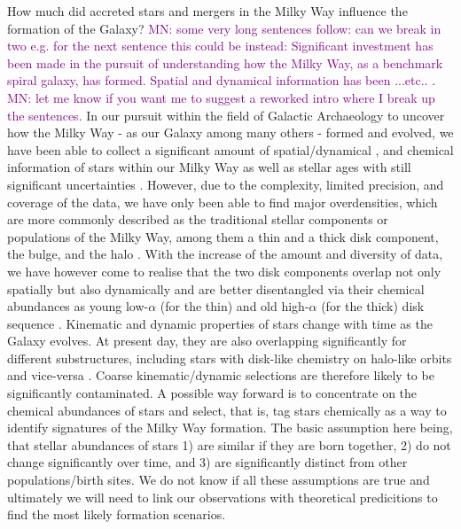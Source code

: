 \documentclass[fleqn,usenatbib]{mnras}
\newcommand{\mkn}[1]{{\textcolor{purple}{MN: #1}}}
\begin{document}
How much did accreted stars and mergers in the Milky Way influence the formation of the Galaxy? \mkn{some very long sentences follow: can we break in two e.g. for the next sentence this could be instead: Significant investment has been made in the pursuit of understanding how the Milky Way, as a benchmark spiral galaxy, has formed. Spatial and dynamical information has been ...etc.. }. \mkn{let me know if you want me to suggest a reworked intro where I break up the sentences.} In our pursuit within the field of Galactic Archaeology to uncover how the Milky Way - as our Galaxy among many others - formed and evolved, we have been able to collect a significant amount of spatial/dynamical \citep[e.g.][]{Brown2021}, and chemical information \citep{Jofre2019} of stars within our Milky Way as well as stellar ages with still significant uncertainties \citep{Soderblom2010}. However, due to the complexity, limited precision, and coverage of the data, we have only been able to find major overdensities, which are more commonly described as the traditional stellar components or populations of the Milky Way, among them a thin and a thick disk component, the bulge, and the halo \citep[see.e.g.][for a review]{BlandHawthorn_Gerhard2016}. With the increase of the amount and diversity of data, we have however come to realise that the two disk components overlap not only spatially but also dynamically \citep[e.g.][]{Bovy2012b} and are better disentangled via their chemical abundances as young low-$\alpha$ (for the thin) and old high-$\alpha$ (for the thick) disk sequence \citep[e.g.][]{Buder2019, BlandHawthorn2019}. Kinematic and dynamic properties of stars change with time as the Galaxy evolves. At present day, they are also overlapping significantly for different substructures, including stars with disk-like chemistry on halo-like orbits and vice-versa \citep[e.g.][]{Belokurov2020, Sestito2020}. Coarse kinematic/dynamic selections are therefore likely to be significantly contaminated. A possible way forward is to concentrate on the chemical abundances of stars and select, that is, tag stars chemically \citep[see e.g.][for a review on chemical tagging]{FreemanBlandHawthorn2002} as a way to identify signatures of the Milky Way formation. The basic assumption here being, that stellar abundances of stars 1) are  similar if they are born together, 2) do not change significantly over time, and 3) are significantly distinct from other populations/birth sites. We do not know if all these assumptions are true \citep{Bovy2016b, Ness2018, Ness2019b} and ultimately we will need to link our observations with theoretical predicitions to find the most likely formation scenarios. 
\end{document}
